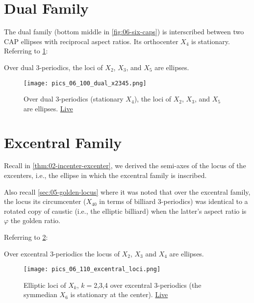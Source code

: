 \section{Dual Family}

The dual family (bottom middle in \cref{fig:06-six-caps}) is interscribed between two CAP ellipses with reciprocal aspect ratios. Its orthocenter $X_4$ is stationary. Referring to \cref{fig:06-dual-x2345}:

\begin{proposition}
Over dual 3-periodics, the loci of $X_2$, $X_3$, and $X_5$ are ellipses.
\label{prop:06-dual-x2345}
\end{proposition}

\begin{figure}
    \centering
    \texttt{[image: pics\_06\_100\_dual\_x2345.png]}
    \caption{Over dual 3-periodics (stationary $X_4$), the loci of $X_2$, $X_3$, and $X_5$ are ellipses. \href{https://bit.ly/3wE3zQg}{Live}}
    \label{fig:06-dual-x2345}
\end{figure}

\section{Excentral Family}

Recall in \cref{thm:02-incenter-excenter}, we derived the semi-axes of the locus of the excenters, i.e., the ellipse in which the excentral family is inscribed. 

Also recall \cref{sec:05-golden-locus} where it was noted that over the excentral family, the locus its circumcenter ($X_{40}$ in terms of billiard 3-periodics) was identical to a rotated copy of caustic (i.e., the elliptic billiard) when the latter's aspect ratio is $\varphi$ the golden ratio.

Referring to \cref{fig:06-excentral-loci}:

\begin{proposition}
Over excentral 3-periodics the locus of $X_2$, $X_3$ and $X_4$ are ellipses.
\label{prop:06-excentral-loci}
\end{proposition}

\begin{figure}
    \centering
    \texttt{[image: pics\_06\_110\_excentral\_loci.png]}
    \caption{Elliptic loci of $X_k$, $k=$2,3,4 over excentral 3-periodics (the symmedian $X_6$ is stationary at the center). \href{https://bit.ly/2RSwAZF}{Live}}
    \label{fig:06-excentral-loci}
\end{figure}
